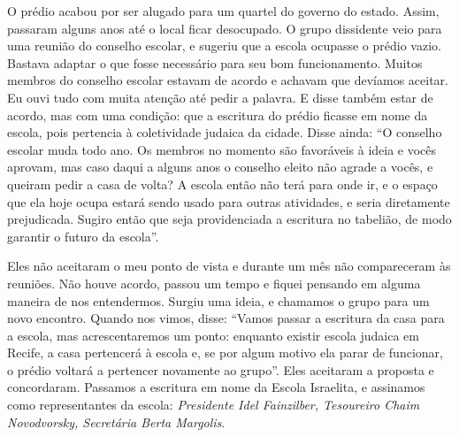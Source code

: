 O prédio acabou por ser alugado para um quartel do governo do estado. Assim, passaram
alguns anos até o local ficar desocupado. O grupo dissidente veio para
uma reunião do conselho escolar, e sugeriu que a escola 
ocupasse o prédio vazio. Bastava adaptar o que fosse necessário
para seu bom funcionamento. Muitos membros do conselho escolar
estavam de acordo e achavam que devíamos aceitar. Eu ouvi
tudo com muita atenção até pedir a palavra. E disse também estar de acordo, mas com uma condição: que a escritura do prédio ficasse em nome da escola, pois pertencia à 
coletividade judaica da cidade. Disse ainda: ``O conselho escolar muda todo ano. Os membros no momento são favoráveis à ideia e vocês aprovam, mas caso daqui a alguns anos o conselho eleito não agrade a vocês, e queiram pedir a casa de volta? A escola então não terá para onde ir, e o espaço que ela hoje ocupa estará sendo usado para outras atividades, e seria diretamente 
prejudicada. Sugiro então que seja providenciada a escritura no tabelião,
de modo garantir o futuro da escola''.

Eles não aceitaram o meu ponto de vista e durante um mês não
compareceram às reuniões. Não houve acordo, passou
um tempo e fiquei pensando em alguma maneira de nos entendermos.
Surgiu uma ideia, e chamamos o grupo para um novo encontro. Quando nos
vimos, disse: ``Vamos passar a escritura da casa
para a escola, mas acrescentaremos um ponto: enquanto existir escola
judaica em Recife, a casa pertencerá à escola e, se por algum motivo
ela parar de funcionar, o prédio voltará a pertencer novamente ao
grupo''. Eles aceitaram a proposta e concordaram. Passamos a escritura
em nome da Escola Israelita, e assinamos como representantes da escola: 
\textit{Presidente Idel Fainzilber, Tesoureiro Chaim Novodvorsky, Secretária Berta Margolis}.




